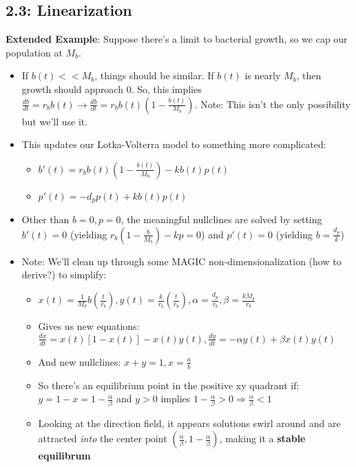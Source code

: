 \documentclass[11pt, oneside]{article}   	%
\begin{document}
\subsection{2.3: Linearization}

\textbf{Extended Example}: Suppose there's a limit to bacterial growth, so we cap our population at $M_b$.
\begin{itemize}
\item If $b(t) << M_b$, things should be similar.  If $b(t)$ is nearly $M_b$, then growth should approach 0.  So, this implies $\frac{db}{dt} = r_bb(t) \rightarrow \frac{db}{dt} = r_bb(t) (1-\frac{b(t)}{M_b})$.  Note: This isn't the only possibility but we'll use it.
\item This updates our Lotka-Volterra model to something more complicated:
\begin{itemize}
\item $b'(t) = r_bb(t) (1-\frac{b(t)}{M_b})- kb(t)p(t)$
\item $p'(t) = -d_p p(t) + kb(t)p(t)$
\end{itemize}
\item Other than $b=0, p=0$, the meaningful nullclines are solved by setting $b'(t) = 0$ (yielding $r_b(1-\frac{b}{M_b})-kp = 0$) and $p'(t) = 0$ (yielding $b = \frac{d_p}{k}$)
\item Note: We'll clean up through some MAGIC non-dimensionalization (how to derive?) to simplify:
\begin{itemize}
\item $x(t) = \frac{1}{M_b}b(\frac{t}{r_b}), y(t) = \frac{k}{r_b}(\frac{t}{r_b}), \alpha = \frac{d_p}{r_b}, \beta = \frac{kM_b}{r_b}$
\item Gives us new equations: $\frac{dx}{dt} = x(t)[1-x(t)] - x(t)y(t), \frac{dy}{dt} = -\alpha y(t) + \beta x(t)y(t)$
\item And new nullclines: $x+y=1, x=\frac{a}{b}$
\item So  there's an equilibrium point in the positive xy quadrant if: $y = 1-x = 1-\frac{\alpha}{\beta}$ and $y > 0$ implies $1-\frac{\alpha}{\beta} > 0 \Rightarrow \frac{\alpha}{\beta} < 1$
\item Looking at the direction field, it appears solutions swirl around and are attracted \emph{into} the center point $(\frac{\alpha}{\beta}, 1 - \frac{\alpha}{\beta})$, making it a \textbf{stable equilibrum}
\end{itemize}
\end{itemize}
\end{document}
